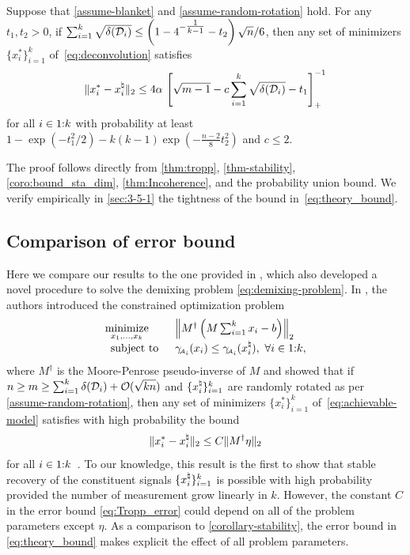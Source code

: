 \begin{theorem} \label{corollary-stability}
    Suppose that \autoref{assume-blanket} and \autoref{assume-random-rotation} hold. For any $t_1, t_2 > 0$, if $\sum_{i=1}^k \sqrt{\delta(\mathcal{D}_i)} \leq \left(1 - 4^{- \tfrac{1}{k-1} } - t_2\right)\sqrt{n} / 6$, then any set of minimizers $\{x_i^*\}_{i=1}^k$ of~\eqref{eq:deconvolution} satisfies 
  \begin{equation} \label{eq:theory_bound}
    \|x_i^* - x_i^{\natural}\|_2 
     \leq
     4\alpha\,\left[\sqrt{m-1} - c\sum_{i=1}^k \sqrt{\delta(\mathcal{D}_i)} - t_1\right]_+^{-1}
  \end{equation}
   for all $i\in1\mathord{:}k$ with probability at least $1 - \exp\left(-t_1^2/2\right) - k(k-1)\exp(-\tfrac{n-2}{8}t_2^2)$ and $c\leq2$.
\end{theorem}
The proof follows directly from \autoref{thm:tropp}, \autoref{thm-stability}, \autoref{coro:bound_sta_dim}, \autoref{thm:Incoherence}, and the probability union bound. We verify empirically in \autoref{sec:3-5-1} the tightness of the bound in~\eqref{eq:theory_bound}.

\subsection{Comparison of error bound} \label{sec:comparasion}

Here we compare our results to the one provided in \cite{mccoy2013achievable}, which also developed a novel procedure to solve the demixing problem \eqref{eq:demixing-problem}. In \cite{mccoy2013achievable}, the authors introduced the constrained optimization problem
\begin{equation}
    \label{eq:achievable-model}
    \begin{array}{ll}
    \displaystyle\mathop{\hbox{\rm minimize}}_{x_1,\ldots,x_k}\enspace
    & \left\|
      M^\dagger\left(M\sum_{i=1}^k x_i - b\right)
    \right\|_2 \\
   \enspace\mathop{\hbox{\rm subject to}}\enspace
    & \gamma_{\!\scriptscriptstyle\mathcal{A}_i}(x_i) \le \gamma_{\!\scriptscriptstyle\mathcal{A}_i}(x_i^{\natural}), \ \forall i\in1\mathord{:}k,
    \end{array}
\end{equation}
where $M^\dagger$ is the Moore-Penrose pseudo-inverse of $M$ and showed that if \(n\ge m\ge \sum_{i=1}^k\delta(\mathcal{D}_i)+\mathcal{O}(\sqrt{kn})\) and $\{x_i^{\natural}\}_{i=1}^k$ are randomly rotated as per \autoref{assume-random-rotation}, then any set of minimizers $\{x_i^*\}_{i=1}^k$ of~\eqref{eq:achievable-model} satisfies with high probability the bound
\begin{equation}\label{eq:Tropp_error}
    \|x_i^*-x_i^{\natural}\|_2\le C\|M^\dagger\eta\|_2
\end{equation}
for all $i\in1\mathord{:}k$~\cite[Theorem~A]{mccoy2013achievable}. To our knowledge, this result is the first to show that stable recovery of the constituent signals $\{x_i^{\natural}\}_{i=1}^k$ is possible with high probability provided the number of measurement grow linearly in $k$. However, the constant $C$ in the error bound \eqref{eq:Tropp_error} could depend on all of the problem parameters except $\eta$. As a comparison to \autoref{corollary-stability}, the error bound in \eqref{eq:theory_bound} makes explicit the effect of all problem parameters.


